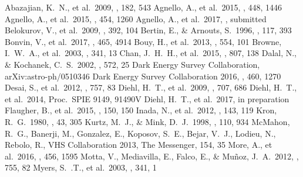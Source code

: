 \documentclass[twocolumn]{aastex6}
\begin{document}
\begin{thebibliography}{}

 Abazajian, K.~N., et al.\ 2009, \apjs, 182, 543
 Agnello, A., et al.\ 2015, \mnras, 448, 1446
 Agnello, A., et al.\ 2015, \mnras, 454, 1260
 Agnello, A., et al.\ 2017, \mnras, submitted
 Belokurov, V., et al.\ 2009, \mnras, 392, 104
 Bertin, E., \& Arnouts, S.\ 1996, \aaps, 117, 393
 Bonvin, V., et al.\ 2017, \mnras, 465, 4914
 Bouy, H., et al.\ 2013, \aap, 554, 101
 Browne, I.~W.~A., et al.\ 2003, \mnras, 341, 13
 Chan, J.~H.~H., et al.\ 2015, \apj, 807, 138
 Dalal, N., \& Kochanek, C.~S.\ 2002, \apj, 572, 25
 Dark Energy Survey Collaboration, arXiv:astro-ph/0510346
 Dark Energy Survey Collaboration 2016, \mnras, 460, 1270
 Desai, S., et al.\ 2012, \apj, 757, 83
 Diehl, H.~T., et al.\ 2009, \apj, 707, 686
 Diehl, H.~T., et al.\ 2014, Proc.\ SPIE 9149, 91490V
 Diehl, H.~T., et al.\ 2017, in preparation
 Flaugher, B., et al.\ 2015, \aj, 150, 150
 Inada, N., et al.\ 2012, \aj, 143, 119
 Kron, R.~G.\ 1980, \apjs, 43, 305
 Kurtz, M.~J., \& Mink, D.~J.\ 1998, \pasp, 110, 934
 McMahon, R.~G., Banerji, M., 
Gonzalez, E., Koposov, S.~E., Bejar, V.~J., Lodieu, N., Rebolo, R., 
VHS Collaboration 2013, The Messenger, 154, 35
 More, A., et al.\ 2016, \mnras, 456, 1595
 Motta, V., Mediavilla, E., Falco, E., 
\& Mu\~{n}oz, J.~A.\ 2012, \apj, 755, 82
 Myers, S.~.T., et al.\ 2003, \mnras, 341, 1

\end{thebibliography}
\end{document}
